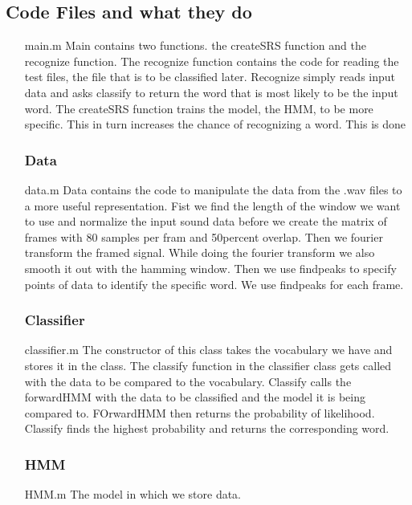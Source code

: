 \documentclass[titlepage]{article}
\begin{document}
\subsection{Code Files and what they do}
\begin{itemize}
\subsubsection{Main} \item[main.m] Main contains two functions. the createSRS function and the recognize function. The recognize function contains the code for reading the test files, the file that is to be classified later. Recognize simply reads input data and asks classify to return the word that is most likely to be the input word. The createSRS function trains the model, the HMM, to be more specific. This in turn increases the chance of recognizing a word. This is done 
\subsubsection{Data} \item[data.m] Data contains the code to manipulate the data from the .wav files to a more useful representation. Fist we find the length of the window we want to use and normalize the input sound data before we create the matrix of frames with 80 samples per fram and 50percent overlap. Then we fourier transform the framed signal. While doing the fourier transform we also smooth it out with the hamming window. Then we use findpeaks to specify points of data to identify the specific word. We use findpeaks for each frame.  
\subsubsection{Classifier}\item[classifier.m] The constructor of this class takes the vocabulary we have and stores it in the class. The classify function in the classifier class gets called with the data to be compared to the vocabulary. Classify calls the forwardHMM with the data to be classified and the model it is being compared to. FOrwardHMM then returns the probability of likelihood. Classify finds the highest probability and returns the corresponding word.  
\subsubsection{HMM}\item[HMM.m] The model in which we store data.


\end{itemize}
\end{document}
